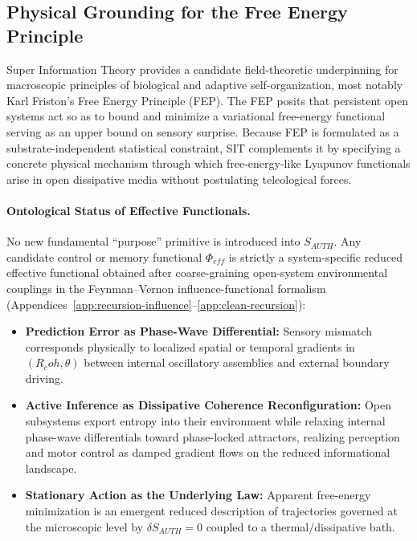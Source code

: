 \documentclass[american,11pt,letterpaper]{article}
\newcommand{\Rcoh}{R_{\mathrm{coh}}}
\def\mathrm#1{#1}%
\def\emph#1{#1}%
\def\Rcoh{R_coh}%
\begin{document}
\subsection{Physical Grounding for the Free Energy Principle}

Super Information Theory provides a candidate field-theoretic underpinning for macroscopic principles of biological and adaptive self-organization, most notably Karl Friston's Free Energy Principle (FEP). The FEP posits that persistent open systems act so as to bound and minimize a variational free-energy functional serving as an upper bound on sensory surprise. Because FEP is formulated as a substrate-independent statistical constraint, SIT complements it by specifying a concrete physical mechanism through which free-energy-like Lyapunov functionals arise in open dissipative media without postulating teleological forces.

\paragraph{Ontological Status of Effective Functionals.}
No new fundamental ``purpose'' primitive is introduced into $S_{\mathrm{AUTH}}$. Any candidate control or memory functional $\Phi_{\mathrm{eff}}$ is strictly a \emph{system-specific reduced effective functional} obtained after coarse-graining open-system environmental couplings in the Feynman--Vernon influence-functional formalism (Appendices~\ref{app:recursion-influence}--\ref{app:clean-recursion}):
\begin{itemize}
  \item \textbf{Prediction Error as Phase-Wave Differential:} Sensory mismatch corresponds physically to localized spatial or temporal gradients in $(\Rcoh, \theta)$ between internal oscillatory assemblies and external boundary driving.
  \item \textbf{Active Inference as Dissipative Coherence Reconfiguration:} Open subsystems export entropy into their environment while relaxing internal phase-wave differentials toward phase-locked attractors, realizing perception and motor control as damped gradient flows on the reduced informational landscape.
  \item \textbf{Stationary Action as the Underlying Law:} Apparent free-energy minimization is an emergent reduced description of trajectories governed at the microscopic level by $\delta S_{\mathrm{AUTH}} = 0$ coupled to a thermal/dissipative bath.
\end{itemize}
\end{document}

